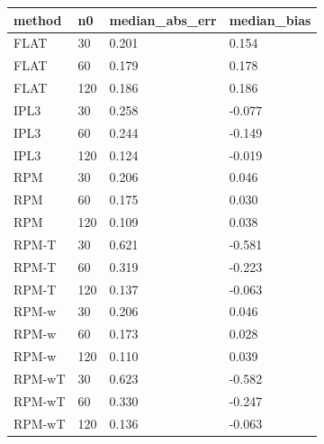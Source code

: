 \begin{tabular}{llll}
\hline
method & n0 & median\_abs\_err & median\_bias \\
\hline
FLAT & 30 & 0.201 & 0.154 \\
FLAT & 60 & 0.179 & 0.178 \\
FLAT & 120 & 0.186 & 0.186 \\
IPL3 & 30 & 0.258 & -0.077 \\
IPL3 & 60 & 0.244 & -0.149 \\
IPL3 & 120 & 0.124 & -0.019 \\
RPM & 30 & 0.206 & 0.046 \\
RPM & 60 & 0.175 & 0.030 \\
RPM & 120 & 0.109 & 0.038 \\
RPM-T & 30 & 0.621 & -0.581 \\
RPM-T & 60 & 0.319 & -0.223 \\
RPM-T & 120 & 0.137 & -0.063 \\
RPM-w & 30 & 0.206 & 0.046 \\
RPM-w & 60 & 0.173 & 0.028 \\
RPM-w & 120 & 0.110 & 0.039 \\
RPM-wT & 30 & 0.623 & -0.582 \\
RPM-wT & 60 & 0.330 & -0.247 \\
RPM-wT & 120 & 0.136 & -0.063 \\
\hline
\end{tabular}

